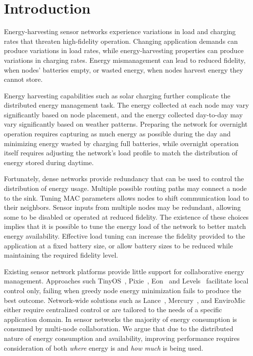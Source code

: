 \section{Introduction}
\label{sec-introduction}

Energy-harvesting sensor networks experience variations in load and charging
rates that threaten high-fidelity operation. Changing application demands can
produce variations in load rates, while energy-harvesting properties can
produce variations in charging rates. Energy mismanagement
can lead to reduced fidelity, when nodes' batteries empty, or wasted energy,
when nodes harvest energy they cannot store.

Energy harvesting capabilities such as solar charging further complicate the
distributed energy management task. The energy collected at each node may
vary significantly based on node placement, and the energy collected
day-to-day may vary significantly based on weather patterns. Preparing the
network for overnight operation requires capturing as much energy as possible
during the day and minimizing energy wasted by charging full batteries, while
overnight operation itself requires adjusting the network's load profile to
match the distribution of energy stored during daytime.

Fortunately, dense networks provide redundancy that can be used to control
the distribution of energy usage.  Multiple possible routing paths may
connect a node to the sink. Tuning MAC parameters allows nodes to shift
communication load to their neighbors. Sensor inputs from multiple nodes may
be redundant, allowing some to be disabled or operated at reduced fidelity.
The existence of these choices implies that it is possible to tune the energy
load of the network to better match energy availability.  Effective load
tuning can increase the fidelity provided to the application at a fixed
battery size, or allow battery sizes to be reduced while maintaining the
required fidelity level.

Existing sensor network platforms provide little support for collaborative
energy management. Approaches such TinyOS~\cite{tinyos-asplos00},
Pixie~\cite{pixie-sensys08}, Eon~\cite{eon-sensys07} and
Levels~\cite{levels-sensys07} facilitate local control only, failing when
greedy node energy minimization fails to produce the best outcome.
Network-wide solutions such as Lance~\cite{lance-sensys08},
Mercury~\cite{parkinsons-embs07}, and EnviroMic~\cite{enviromic} either
require centralized control or are tailored to the needs of a specific
application domain. In sensor networks the majority of energy consumption is
consumed by multi-node collaboration. We argue that due to the distributed
nature of energy consumption and availability, improving performance
requires consideration of both \textit{where} energy is and \textit{how much}
is being used.

